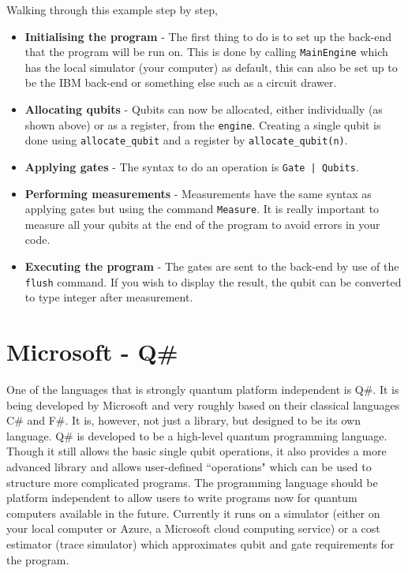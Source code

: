 \inputminted{python}{code/ProjectQ/superpos_projectq.txt}

Walking through this example step by step,

\begin{itemize}
    \item \textbf{Initialising the program} - The first thing to do is to set up the back-end that the program will be run on. This is done by calling \texttt{MainEngine} which has the local simulator (your computer) as default, this can also be set up to be the IBM back-end or something else such as a circuit drawer.
    \item \textbf{Allocating qubits} - Qubits can now be allocated, either individually (as shown above) or as a register, from the \texttt{engine}. Creating a single qubit is done using \texttt{allocate\_qubit} and a register by \texttt{allocate\_qubit(n)}.
    \item \textbf{Applying gates} - The syntax to do an operation is  \texttt{Gate | Qubits}. 
    \item \textbf{Performing measurements} - Measurements have the same syntax as applying gates but using the command \texttt{Measure}. It is really important to measure all your qubits at the end of the program to avoid errors in your code.
    \item \textbf{Executing the program} - The gates are sent to the back-end by use of the \texttt{flush} command. If you wish to display the result, the qubit can be converted to type integer after measurement.
\end{itemize}

\section{Microsoft - Q\#}

One of the languages that is strongly quantum platform independent is Q\#. It is being developed by Microsoft and very roughly based on their classical languages C\# and F\#. It is, however, not just a library, but designed to be its own language. Q\# is developed to be a high-level quantum programming language. Though it still allows the basic single qubit operations, it also provides a more advanced library and allows user-defined ``operations" which can be used to structure more complicated programs. The programming language should be platform independent to allow users to write programs now for quantum computers available in the future. Currently it runs on a simulator (either on your local computer or Azure, a Microsoft cloud computing service) or a cost estimator (trace simulator) which approximates qubit and gate requirements for the program. 


